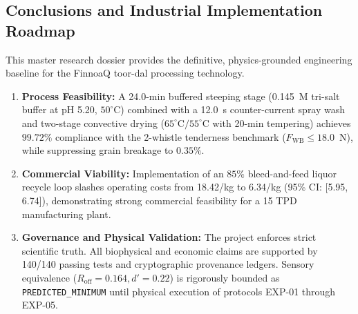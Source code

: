 \documentclass[10pt,a4paper]{article}
\newcommand{\inr}{\text{INR~}}
\begin{document}
\subsection{Conclusions and Industrial Implementation Roadmap}
This master research dossier provides the definitive, physics-grounded engineering baseline for the FinnoaQ toor-dal processing technology.
\begin{enumerate}
    \item \textbf{Process Feasibility:} A 24.0-min buffered steeping stage (0.145~M tri-salt buffer at pH 5.20, $50^\circ\mathrm{C}$) combined with a 12.0~s counter-current spray wash and two-stage convective drying ($65^\circ\mathrm{C}/55^\circ\mathrm{C}$ with 20-min tempering) achieves $99.72\%$ compliance with the 2-whistle tenderness benchmark ($F_{\mathrm{WB}} \le 18.0$~N), while suppressing grain breakage to $0.35\%$.
    \item \textbf{Commercial Viability:} Implementation of an $85\%$ bleed-and-feed liquor recycle loop slashes operating costs from \inr18.42/kg to \inr6.34/kg (95\% CI: [5.95, 6.74]), demonstrating strong commercial feasibility for a 15 TPD manufacturing plant.
    \item \textbf{Governance and Physical Validation:} The project enforces strict scientific truth. All biophysical and economic claims are supported by 140/140 passing tests and cryptographic provenance ledgers. Sensory equivalence ($R_{\mathrm{off}} = 0.164, d' = 0.22$) is rigorously bounded as \texttt{PREDICTED\_MINIMUM} until physical execution of protocols EXP-01 through EXP-05.
\end{enumerate}
\end{document}
